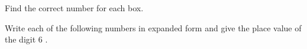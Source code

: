 \begin{exercises}
    \begin{questions}
        \Question[8] Find the correct number for each box.
        \begin{multicols}{2}
        \end{multicols}
        \Question[6] Write each of the following numbers in expanded form and give the place value of the digit 6 .
        \begin{parts}
\end{parts}
\end{questions}
\end{exercises}
